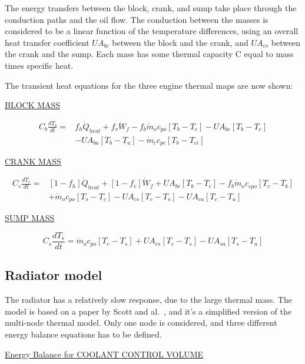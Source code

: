 The energy transfers between the block, crank, and sump take place through the conduction paths and the oil flow. The conduction between the masses is considered to be a linear function of the temperature differences, using an overall heat transfer coefficient $UA_{bc}$ between the block and the crank, and $UA_{cs}$ between the crank and the sump. Each mass has some thermal capacity C equal to mass times specific heat.

The transient heat equations for the three engine thermal maps are now shown:

\uline{BLOCK MASS}


\begin{equation}
  \begin{split}
    C_{b}\frac{dT_{b}}{dt}  = &f_{h}\dot{Q}_{heat} + f_{v}\dot{W}_f - f_b\dot{m}_oc_{po}[T_b-T_c]  - UA_{bc}[T_b-T_c] \\
    &- UA_{ba}[T_b-T_a] - \dot{m}_cc_{pc}[T_b-T_{ci}]
  \end{split}
\end{equation}

\uline{CRANK MASS}

\begin{equation}
  \begin{split}
    C_c \frac{dT_c}{dt} = &[1-f_h]\dot{Q}_{heat} + [1-f_v]\dot{W}_f + UA_{bc}[T_b-T_c]-f_b\dot{m}_oc_{cpo}[T_c-T_b] \\
    &+\dot{m}_oc_{po}[T_s-T_c] - UA_{cs}[T_c-T_s] - UA_{ca}[T_c-T_a]
  \end{split}
\end{equation}

\uline{SUMP MASS}

\begin{equation}
  C_s \frac{dT_s}{dt} = \dot{m}_oc_{po}[T_c-T_s]+UA_{cs}[T_c-T_s]-UA_{sa}[T_s-T_a]
\end{equation}


\subsection{Radiator model}

The radiator has a relatively slow response, due to the large thermal mass. The model is based on a paper by Scott and al.~\cite{Scott2003}, and it's a simplified version of the multi-node thermal model. Only one node is considered, and three different energy balance equations has to be defined.

\uline{Energy Balance for COOLANT CONTROL VOLUME}

